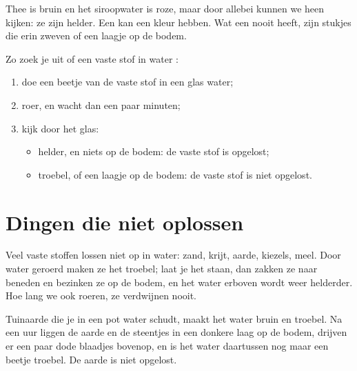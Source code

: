 \begin{remark}\label{rem:g2:mixing-and-dissolving:clear}
Thee is bruin en het siroopwater is roze, maar door allebei kunnen we
heen kijken: ze zijn helder. Een  kan een kleur hebben. Wat een
 nooit heeft, zijn stukjes die erin zweven of een laagje op de
bodem.
\end{remark}

\begin{method}\label{met:g2:mixing-and-dissolving:test}
Zo zoek je uit of een vaste stof in water :
\begin{enumerate}
  \item doe een beetje van de vaste stof in een glas water;
  \item roer, en wacht dan een paar minuten;
  \item kijk door het glas:
    \begin{itemize}
      \item helder, en niets op de bodem: de vaste stof is opgelost;
      \item troebel, of een laagje op de bodem: de vaste stof is niet opgelost.
    \end{itemize}
\end{enumerate}
\end{method}

\section{Dingen die niet oplossen}

\begin{proposition}\label{prop:g2:mixing-and-dissolving:not}
Veel vaste stoffen lossen niet op in water: zand, krijt, aarde, kiezels,
meel. Door water geroerd maken ze het troebel; laat je het staan, dan
zakken ze naar beneden en bezinken ze op de bodem, en het water erboven
wordt weer helderder. Hoe lang we ook roeren, ze verdwijnen nooit.
\end{proposition}

\begin{example}\label{ex:g2:mixing-and-dissolving:mud}
Tuinaarde die je in een pot water schudt, maakt het water bruin en
troebel. Na een uur liggen de aarde en de steentjes in een donkere laag
op de bodem, drijven er een paar dode blaadjes bovenop, en is het water
daartussen nog maar een beetje troebel. De aarde is niet opgelost.
\end{example}

